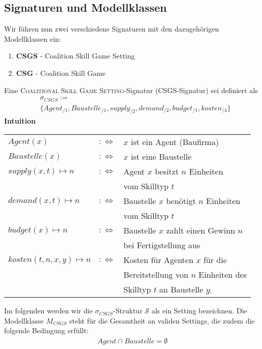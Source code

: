 \subsection{Signaturen und Modellklassen}
\label{sigandmod}
Wir führen nun zwei verschiedene Signaturen mit den dazugehörigen Modellklassen ein:
\begin{enumerate}
  \item \textbf{CSGS} - Coalition Skill Game Setting
  \item \textbf{CSG} - Coalition Skill Game
\end{enumerate}

\begin{definition}[CSGS]
  Eine \textsc{Coalitional Skill Game Setting}-Signatur (CSGS-Signatur) sei definiert als
  \begin{align*}
    &\sigma_{CSGS}:= \\
    &\{Agent_{/1}, Baustelle_{/1}, supply_{/2}, demand_{/2}, budget_{/1}, kosten_{/4} \}
  \end{align*}
  \textbf{Intuition} \\
    \begin{tabular}{lrl}
    $Agent(x)$&$:\Leftrightarrow$& $x$ ist ein Agent (Baufirma) \\
    $Baustelle(x) $&$:\Leftrightarrow$& $x$ ist eine Baustelle \\
    $supply(x, t)\mapsto n $&$:\Leftrightarrow$& Agent $x$ besitzt $n$ Einheiten \\&& vom Skilltyp $t$ \\
    $demand(x, t)\mapsto n $&$:\Leftrightarrow$& Baustelle $x$ benötigt $n$ Einheiten \\&& vom Skilltyp $t$ \\
    $budget(x)\mapsto n $&$:\Leftrightarrow$&
    Baustelle $x$ zahlt einen Gewinn $n$ \\&& bei Fertigstellung aus\\
    $kosten(t, n, x, y)\mapsto n$&$:\Leftrightarrow$& Kosten für Agenten $x$ für die \\&& Bereitstellung von $n$ Einheiten des \\&& Skilltyp $t$ an Baustelle $y$.
    \end{tabular}
\end{definition}

Im folgenden werden wir die $\sigma_{CSGS}$-Struktur $\mathcal{S}$ als ein Setting bezeichnen. Die Modellklasse $M_{CSGS}$ steht für die Gesamtheit an validen Settings, die zudem die folgende Bedingung erfüllt:
\begin{align}
  Agent\cap Baustelle = \emptyset
\end{align}

